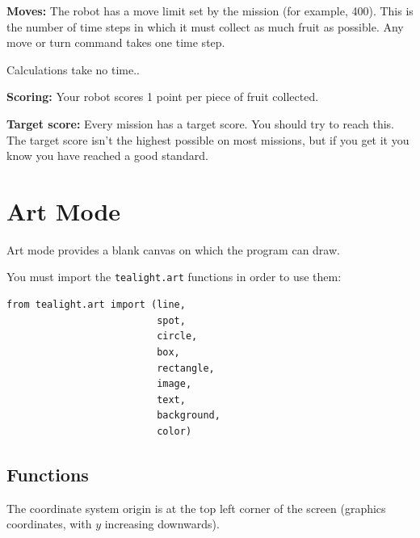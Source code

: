 \documentclass[12pt,a4paper,twoside]{article}
\renewcommand{\_}{\texttt{\symbol{95}}}
\begin{document}
\textbf{Moves:}
The robot has a move limit set by the mission (for example, 400).
This is the number of time steps in which it must collect as much fruit
as possible. Any move or turn command takes one time step.

Calculations take no time..

\textbf{Scoring:}
Your robot scores 1 point per piece of fruit collected. 

\textbf{Target score:}
Every mission has a target score. You should try to reach this.
The target score isn't the highest possible on most missions, but
if you get it you know you have reached a good standard.

\newpage
\section{Art Mode} \label{sec:art-mode}

Art mode provides a blank canvas on which the program can draw.

You must import the \verb^tealight.art^ functions in order to use them:

\begin{verbatim}
from tealight.art import (line, 
                          spot, 
                          circle, 
                          box, 
                          rectangle, 
                          image, 
                          text, 
                          background, 
                          color)
\end{verbatim}

\subsection{Functions}

The coordinate system origin is at the top left corner of the
screen (graphics coordinates, with $y$ increasing downwards).
\end{document}
